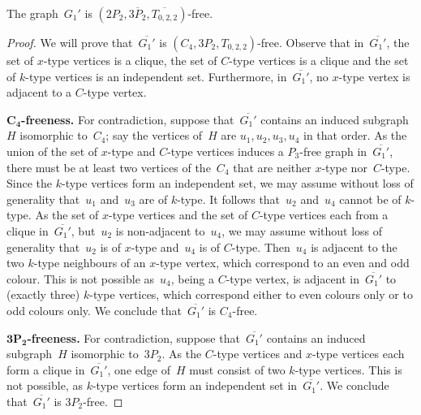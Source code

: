 \documentclass{llncs}
\begin{document}
\begin{lemma}\label{l-s1}
The graph~$G_1'$ is $(2P_2,\overline{3P_2},\overline{T_{0,2,2}})$-free.
\end{lemma}

\begin{proof}
We will prove that~$\overline{G_1'}$ is $(C_4,3P_2,T_{0,2,2})$-free.
Observe that in~$\overline{G_1'}$, the set of $x$-type vertices is a clique, the set of $C$-type vertices is a clique and the set of $k$-type vertices is an independent set.
Furthermore, in~$\overline{G_1'}$, no $x$-type vertex is adjacent to a $C$-type vertex.

\medskip
\noindent
{\bf $\mathbf{C_4}$-freeness.}
For contradiction, suppose that~$\overline{G_1'}$ contains an induced subgraph~$H$ isomorphic to~$C_4$; say the vertices of~$H$ are $u_1,u_2,u_3,u_4$ in that order.
As the union of the set of $x$-type and $C$-type vertices induces a $P_3$-free graph in~$\overline{G_1'}$, there must be at least two vertices of the~$C_4$ that are neither $x$-type nor~$C$-type.
Since the $k$-type vertices form an independent set, we may assume without loss of generality that~$u_1$ and~$u_3$ are of $k$-type.
It follows that~$u_2$ and~$u_4$ cannot be of $k$-type.
As the set of $x$-type vertices and the set of $C$-type vertices each from a clique in~$\overline{G_1'}$, but~$u_2$ is non-adjacent to~$u_4$, we may assume without loss of generality that~$u_2$ is of $x$-type and~$u_4$ is of $C$-type.
Then~$u_4$ is adjacent to the two $k$-type neighbours of an $x$-type vertex, which correspond to an even and odd colour.
This is not possible as~$u_4$, being a $C$-type vertex, is adjacent in~$\overline{G_1'}$ to (exactly three) $k$-type vertices, which correspond either to even colours only or to odd colours only.
We conclude that~$\overline{G_1'}$ is $C_4$-free.

\medskip
\noindent
{\bf $\mathbf{3P_2}$-freeness.}
For contradiction, suppose that~$\overline{G_1'}$ contains an induced subgraph~$H$ isomorphic to~$3P_2$.
As the $C$-type vertices and $x$-type vertices each form a clique in~$\overline{G_1'}$, one edge of~$H$ must consist of two $k$-type vertices.
This is not possible, as $k$-type vertices form an independent set in~$\overline{G_1'}$.
We conclude that~$\overline{G_1'}$ is $3P_2$-free.


\end{proof}
\end{document}
